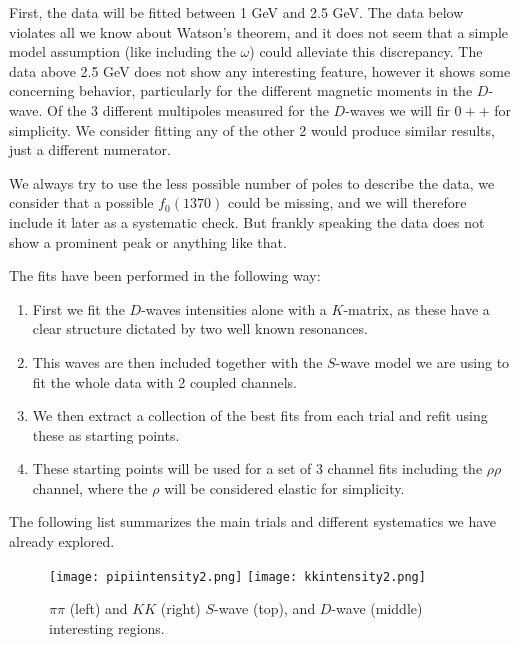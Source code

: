 First, the data will be fitted between 1 GeV and 2.5 GeV. The data below violates all we know about Watson's theorem, and it does not seem that a simple model assumption (like including the $\omega$) could alleviate this discrepancy. The data above 2.5 GeV does not show any interesting feature, however it shows some concerning behavior, particularly for the different magnetic moments in the $D$-wave. Of the 3 different multipoles measured for the $D$-waves we will fir $0++$ for simplicity. We consider fitting any of the other 2 would produce similar results, just a different numerator.

We always try to use the less possible number of poles to describe the data, we consider that a possible $f_0(1370)$ could be missing, and we will therefore include it later as a systematic check. But frankly speaking the data does not show a prominent peak or anything like that.

The fits have been performed in the following way:
\begin{enumerate}
    \item First we fit the $D$-waves intensities alone with a $K$-matrix, as these have a clear structure dictated by two well known resonances.
    \item This waves are then included together with the $S$-wave model we are using to fit the whole data with 2 coupled channels.
    \item We then extract a collection of the best fits from each trial and refit using these as starting points.
    \item These starting points will be used for a set of 3 channel fits including the $\rho \rho$ channel, where the $\rho$ will be considered elastic for simplicity. 
\end{enumerate}

The following list summarizes the main trials and different systematics we have already explored.

\begin{figure}
{\centering
\texttt{[image: pipiintensity2.png]} 
\texttt{[image: kkintensity2.png]}}
\caption{$\pi \pi$ (left) and $KK$ (right) $S$-wave (top), and $D$-wave (middle) interesting regions.}
\label{fig:regions}
\end{figure}

